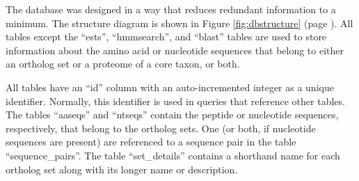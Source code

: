 The database was designed in a way that reduces redundant information to a
minimum. The structure diagram is shown in Figure \ref{fig:dbstructure} (page
\pageref{fig:dbstructure}). All tables except the ``ests'', ``hmmsearch'', and
``blast'' tables are used to store information about the amino acid or
nucleotide sequences that belong to either an ortholog set or a proteome of a
core taxon, or both. 

All tables have an ``id'' column with an auto-incremented integer as a unique
identifier. Normally, this identifier is used in  queries that
reference other tables. The tables ``aaseqs'' and ``ntseqs'' contain the
peptide or nucleotide sequences, respectively, that belong to the ortholog sets.
One (or both, if nucleotide sequences are present) are referenced to a sequence
pair in the table ``sequence\_pairs''. The table ``set\_details'' contains a
shorthand name for each ortholog set along with its longer name or description. 


%


